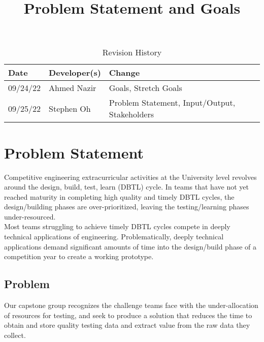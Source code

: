 \documentclass{article}
\title{Problem Statement and Goals\\\progname}
\author{\authname}
\date{}
\begin{document}
\maketitle

\begin{table}[hp]
\caption{Revision History} \label{TblRevisionHistory}
\begin{tabularx}{\textwidth}{llX}
\toprule
\textbf{Date} & \textbf{Developer(s)} & \textbf{Change}\\
\midrule
09/24/22 & Ahmed Nazir & Goals, Stretch Goals\\
09/25/22 & Stephen Oh & Problem Statement, Input/Output, Stakeholders\\
\bottomrule
\end{tabularx}
\end{table}

\section{Problem Statement}


Competitive engineering extracurricular activities at the University level revolves around the design, build, test, learn (DBTL) cycle. In teams that have not yet reached maturity in completing high quality and timely DBTL cycles, the design/building phases are over-prioritized, leaving the testing/learning phases under-resourced.     \\

Most teams struggling to achieve timely DBTL cycles compete in deeply technical applications of engineering. Problematically, deeply technical applications demand significant amounts of time into the design/build phase of a competition year to create a working prototype. \newpage

\subsection{Problem}

Our capstone group recognizes the challenge teams face with the under-allocation of resources for testing, and seek to produce a solution that reduces the time to obtain and store quality testing data and extract value from the raw data they collect. \\ 
\end{document}
